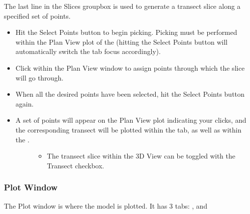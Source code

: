 \documentclass[letterpaper,10pt,english]{sphinxmanual}
\begin{document}
The last line in the Slices groupbox is used to generate a transect slice along a specified set of points.
\begin{itemize}
\item {} 
Hit the Select Points button to begin picking. Picking must be performed within the Plan View plot of the {\hyperref[\detokenize{content/model_viewer/main_window:id1}]{}} (hitting the Select Points button will automatically switch the tab focus accordingly).

\item {} 
Click within the Plan View window to assign points through which the slice will go through.

\item {} 
When all the desired points have been selected, hit the Select Points button again.

\item {} \begin{description}
\item[{A set of points will appear on the Plan View plot indicating your clicks, and the corresponding transect will be plotted within the {\hyperref[\detokenize{content/model_viewer/main_window:transect}]{}} tab, as well as within the {\hyperref[\detokenize{content/model_viewer/main_window:d-view}]{}}.}] \leavevmode\begin{itemize}
\item {} 
The transect slice within the 3D View can be toggled with the Transect checkbox.

\end{itemize}

\end{description}

\end{itemize}


\subsubsection{Plot Window}
\label{\detokenize{content/model_viewer/main_window:plot-window}}
\begin{figure}[htbp]
\centering

\noindent{}
\end{figure}

The Plot window is where the model is plotted. It has 3 tabs: {\hyperref[\detokenize{content/model_viewer/main_window:d-view}]{}}, {\hyperref[\detokenize{content/model_viewer/main_window:id1}]{}} and {\hyperref[\detokenize{content/model_viewer/main_window:transect}]{}}
\end{document}
